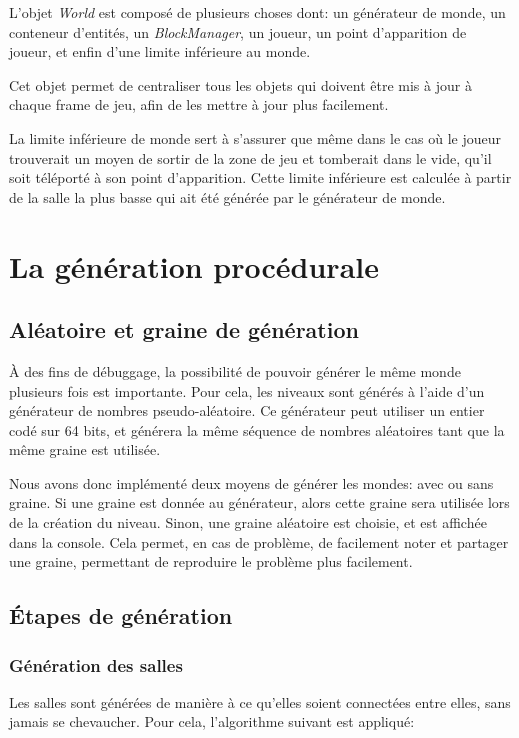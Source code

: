 \documentclass[10pt]{report}
\begin{document}
L'objet \emph{World} est composé de plusieurs choses dont: un générateur de monde, un conteneur d'entités,
un \emph{BlockManager}, un joueur, un point d'apparition de joueur, et enfin d'une limite inférieure au monde.

Cet objet permet de centraliser tous les objets qui doivent être mis à jour à chaque frame de jeu, afin de
les mettre à jour plus facilement.

La limite inférieure de monde sert à s'assurer que même dans le cas où le joueur trouverait un moyen de sortir de la
zone de jeu et tomberait dans le vide, qu'il soit téléporté à son point d'apparition.
Cette limite inférieure est calculée à partir de la salle la plus basse qui ait été générée par le générateur de monde.

\section{La génération procédurale}
\subsection{Aléatoire et graine de génération}

À des fins de débuggage, la possibilité de pouvoir générer le même monde plusieurs fois est importante.
Pour cela, les niveaux sont générés à l'aide d'un générateur de nombres pseudo-aléatoire.
Ce générateur peut utiliser un entier codé sur 64 bits, et générera la même séquence de nombres
aléatoires tant que la même graine est utilisée. 

Nous avons donc implémenté deux moyens de générer les mondes: avec ou sans graine.
Si une graine est donnée au générateur, alors cette graine sera utilisée lors de la création du niveau.
Sinon, une graine aléatoire est choisie, et est affichée dans la console.
Cela permet, en cas de problème, de facilement noter et partager une graine, permettant de reproduire
le problème plus facilement.

\subsection{Étapes de génération}
\subsubsection{Génération des salles}

Les salles sont générées de manière à ce qu'elles soient connectées entre
elles, sans jamais se chevaucher.
Pour cela, l'algorithme suivant est appliqué:
\end{document}
